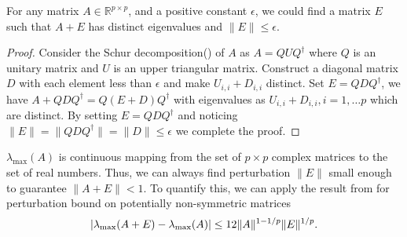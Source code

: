 \begin{lem}
\label{lemma:spectral_simple} 
For any matrix $A\in \mathbb{R}^{p\times p}$, and a positive constant $\epsilon$, we could find a matrix $E$ such that $A+E$ has distinct eigenvalues and $\|E\|\le \epsilon$. 
\begin{proof}
Consider the Schur decomposition(\citep{golub2012matrix}) of $A$ as $A=QUQ^\dag$ where $Q$ is an unitary matrix and $U$ is an upper triangular matrix. Construct a diagonal matrix
$D$ with each element less than $\epsilon$ and make $U_{i,i} + D_{i,i}$ distinct. Set $E = QDQ^\dag$, we have $A+QDQ^\dag = Q (E+D)Q^\dag$ with eigenvalues as $U_{i,i} + D_{i,i}, i=1,\dots p$ which are distinct. By setting $E= QDQ^\dag$ and noticing $\|E\| = \|QDQ^\dag\| = \|D\|\le \epsilon$ we complete the proof. 
\end{proof}
\begin{remark}
$\lambda_{\text{max}}(A)$ is continuous mapping from the set of $p\times p$ complex matrices to the set of real numbers. Thus, we can always find perturbation $\|E\|$ small enough to guarantee $\|A+E\|<1$. To quantify this, we can apply the result from \citet{bhatia1990bounds} for perturbation bound on potentially non-symmetric matrices
\begin{equation}
\label{eq:eigen_bound}
|\lambda_{\textup{max}}(A+E)-\lambda_{\textup{max}}(A)|\le 12\|A\|^{1-1/p}\|E\|^{1/p}.
\end{equation}
\end{remark}
\end{lem}


\iffalse
